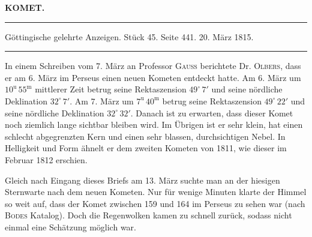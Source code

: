 \clearpage{}
\begin{center}\textbf{KOMET.}\par\vspace{4pt}\hrule\vspace{4pt}\fontsize{10}{12}\selectfont Göttingische gelehrte Anzeigen. Stück 45. Seite 441. 20. März 1815.\par\vspace{4pt}\hrule\vspace{4pt}\end{center}

\par\indent In einem Schreiben vom 7. März an Professor \textsc{Gauss} berichtete Dr. \textsc{Olbers}, dass er am 6. März im Perseus einen neuen Kometen entdeckt hatte. Am 6. März um $10^{\mathrm u}\,55^{\mathrm m}$ mittlerer Zeit betrug seine Rektaszension $49^\circ\,7'$ und seine nördliche Deklination $32^\circ\,7'$. Am 7. März um $7^{\mathrm u}\,40^{\mathrm m}$ betrug seine Rektaszension $49^\circ\,22'$ und seine nördliche Deklination $32^\circ\,32'$. Danach ist zu erwarten, dass dieser Komet noch ziemlich lange sichtbar bleiben wird. Im Übrigen ist er sehr klein, hat einen schlecht abgegrenzten Kern und einen sehr blassen, durchsichtigen Nebel. In Helligkeit und Form ähnelt er dem zweiten Kometen von 1811, wie dieser im Februar 1812 erschien.

\par\indent Gleich nach Eingang dieses Briefs am 13. März suchte man an der hiesigen Sternwarte nach dem neuen Kometen. Nur für wenige Minuten klarte der Himmel so weit auf, dass der Komet zwischen 159 und 164 im Perseus zu sehen war (nach \textsc{Bodes} Katalog). Doch die Regenwolken kamen zu schnell zurück, sodass nicht einmal eine Schätzung möglich war.
